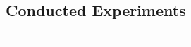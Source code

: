 \documentclass[qualificacao, mestrado, pre-defesa]{packages/icmc}
\begin{document}

%     

%     




\begin{anexosenv}

    \chapter{Conducted Experiments}
    \label{chapter:experiments}
    

\end{anexosenv}
---
\end{document}
